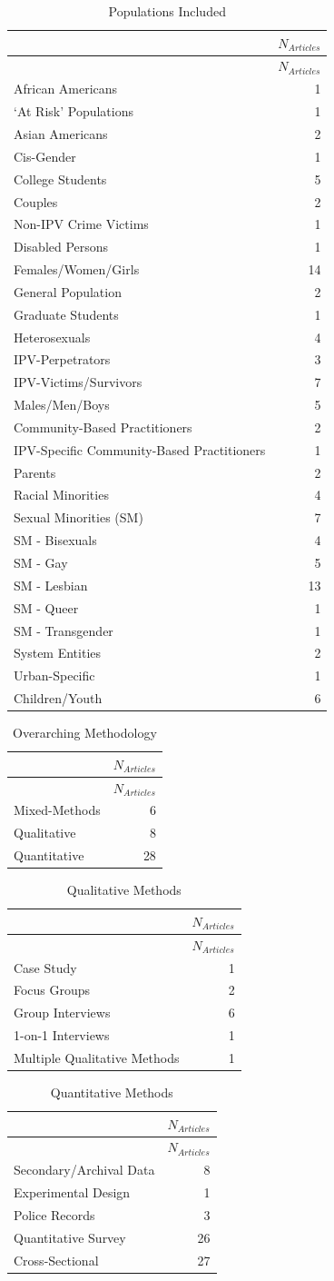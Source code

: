 \documentclass[]{tufte-handout}
\begin{document}
\begin{longtable}[]{@{}lr@{}}
\caption{Populations Included}\tabularnewline
\toprule
& \(N_{Articles}\)\tabularnewline
\midrule
\endfirsthead
\toprule
& \(N_{Articles}\)\tabularnewline
\midrule
\endhead
African Americans & 1\tabularnewline
`At Risk' Populations & 1\tabularnewline
Asian Americans & 2\tabularnewline
Cis-Gender & 1\tabularnewline
College Students & 5\tabularnewline
Couples & 2\tabularnewline
Non-IPV Crime Victims & 1\tabularnewline
Disabled Persons & 1\tabularnewline
Females/Women/Girls & 14\tabularnewline
General Population & 2\tabularnewline
Graduate Students & 1\tabularnewline
Heterosexuals & 4\tabularnewline
IPV-Perpetrators & 3\tabularnewline
IPV-Victims/Survivors & 7\tabularnewline
Males/Men/Boys & 5\tabularnewline
Community-Based Practitioners & 2\tabularnewline
IPV-Specific Community-Based Practitioners & 1\tabularnewline
Parents & 2\tabularnewline
Racial Minorities & 4\tabularnewline
Sexual Minorities (SM) & 7\tabularnewline
SM - Bisexuals & 4\tabularnewline
SM - Gay & 5\tabularnewline
SM - Lesbian & 13\tabularnewline
SM - Queer & 1\tabularnewline
SM - Transgender & 1\tabularnewline
System Entities & 2\tabularnewline
Urban-Specific & 1\tabularnewline
Children/Youth & 6\tabularnewline
\bottomrule
\end{longtable}

\begin{longtable}[]{@{}lr@{}}
\caption{Overarching Methodology}\tabularnewline
\toprule
& \(N_{Articles}\)\tabularnewline
\midrule
\endfirsthead
\toprule
& \(N_{Articles}\)\tabularnewline
\midrule
\endhead
Mixed-Methods & 6\tabularnewline
Qualitative & 8\tabularnewline
Quantitative & 28\tabularnewline
\bottomrule
\end{longtable}

\begin{longtable}[]{@{}lr@{}}
\caption{Qualitative Methods}\tabularnewline
\toprule
& \(N_{Articles}\)\tabularnewline
\midrule
\endfirsthead
\toprule
& \(N_{Articles}\)\tabularnewline
\midrule
\endhead
Case Study & 1\tabularnewline
Focus Groups & 2\tabularnewline
Group Interviews & 6\tabularnewline
1-on-1 Interviews & 1\tabularnewline
Multiple Qualitative Methods & 1\tabularnewline
\bottomrule
\end{longtable}

\begin{longtable}[]{@{}lr@{}}
\caption{Quantitative Methods}\tabularnewline
\toprule
& \(N_{Articles}\)\tabularnewline
\midrule
\endfirsthead
\toprule
& \(N_{Articles}\)\tabularnewline
\midrule
\endhead
Secondary/Archival Data & 8\tabularnewline
Experimental Design & 1\tabularnewline
Police Records & 3\tabularnewline
Quantitative Survey & 26\tabularnewline
Cross-Sectional & 27\tabularnewline
\bottomrule
\end{longtable}
\end{document}
